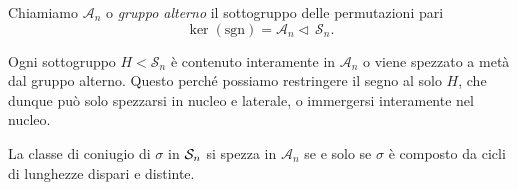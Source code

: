\begin{multicols}{2}
\begin{definition}
	Chiamiamo $ \mathcal{A}_n $ o \emph{gruppo alterno} il sottogruppo delle permutazioni pari
	\[ \ker(\text{sgn}) = \mathcal{A}_n \lhd\, \mathcal{S}_n. \]
\end{definition}
\begin{remark}
	Ogni sottogruppo $ H < \mathcal{S}_n $ è contenuto interamente in $ \mathcal{A}_n $ o viene spezzato a metà dal gruppo alterno. Questo perché possiamo restringere il segno al solo $ H $, che dunque può solo spezzarsi in nucleo e laterale, o immergersi interamente nel nucleo.
\end{remark}

\begin{prop}[di spezzamento]
	La classe di coniugio di $ \sigma $ in $ \S_n $ si spezza in $ \mathcal{A}_n $ se e solo se $ \sigma $ è composto da cicli di lunghezze dispari e distinte.
\end{prop}





\end{multicols}
